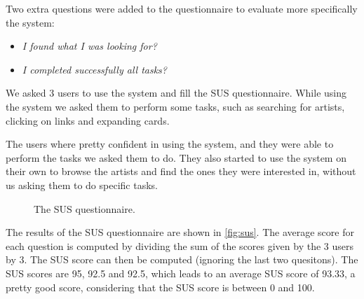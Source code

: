 \documentclass[tikz,14pt]{article}
\begin{document}
Two extra questions were added to the questionnaire to evaluate more specifically the system:
\begin{itemize}
    \item \textit{I found what I was looking for?}
    \item \textit{I completed successfully all tasks?}
\end{itemize}

We asked 3 users to use the system and fill the SUS questionnaire.
While using the system we asked them to perform some tasks, such as searching for artists, clicking on links and expanding cards.

The users where pretty confident in using the system, and they were able to perform the tasks we asked them to do.
They also started to use the system on their own to browse the artists and find the ones they were interested in, without us asking them to do specific tasks.







\begin{figure}
    \caption{The SUS questionnaire.}
    \label{fig:sus}
\end{figure}

The results of the SUS questionnaire are shown in \autoref{fig:sus}.
The average score for each question is computed by dividing the sum of the scores given by the 3 users by 3.
The SUS score can then be computed (ignoring the last two quesitons). 
The SUS scores are 95, 92.5 and 92.5, which leads to an average SUS score of 93.33, a pretty good score, considering that the SUS score is between 0 and 100.
\end{document}
